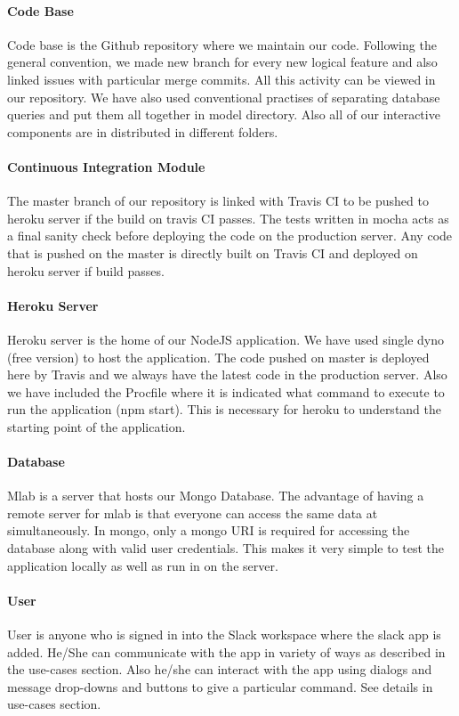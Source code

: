 \paragraph{Code Base}
Code base is the Github repository where we maintain our code. Following the general convention, we made new branch for every new logical feature and also linked issues with particular merge commits. All this activity can be viewed in our repository. We have also used conventional practises of separating database queries and put them all together in model directory. Also all of our interactive components are in distributed in different folders.

\paragraph{Continuous Integration Module}
The master branch of our repository is linked with Travis CI to be pushed to heroku server if the build on travis CI passes. The tests written in mocha acts as a final sanity check before deploying the code on the production server. Any code that is pushed on the master is directly built on Travis CI and deployed on heroku server if build passes.

\paragraph{Heroku Server}
Heroku server is the home of our NodeJS application. We have used single dyno (free version) to host the application. The code pushed on master is deployed here by Travis and we always have the latest code in the production server. Also we have included the Procfile where it is indicated what command to execute to run the application (npm start). This is necessary for heroku to understand the starting point of the application.

\paragraph{Database}
Mlab is a server that hosts our Mongo Database. The advantage of having a remote server for mlab is that everyone can access the same data at simultaneously. In mongo, only a mongo URI is required for accessing the database along with valid user credentials. This makes it very simple to test the application locally as well as run in on the server.

\paragraph{User}
User is anyone who is signed in into the Slack workspace where the slack app is added. He/She can communicate with the app in variety of ways as described in the use-cases section. Also he/she can interact with the app using dialogs and message drop-downs and buttons to give a particular command. See details in use-cases section.

